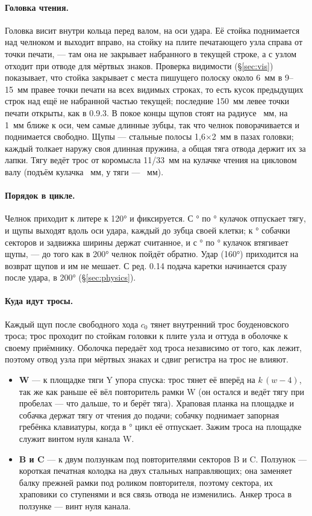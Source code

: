 \paragraph{Головка чтения.} Головка висит внутри кольца перед валом, на оси удара. Её стойка поднимается над челноком и выходит вправо, на стойку на плите печатающего узла справа от точки печати, — там она не закрывает набранного в текущей строке, а с узлом отходит при отводе для мёртвых знаков. Проверка видимости (\S\ref{sec:vis}) показывает, что стойка закрывает с места пишущего полоску около 6~мм в 9--15~мм правее точки печати на всех видимых строках, то есть кусок предыдущих строк над ещё не набранной частью текущей; последние 150~мм левее точки печати открыты, как в 0.9.3. В покое концы щупов стоят на радиусе \rdRzero~мм, на 1~мм ближе к оси, чем самые длинные зубцы, так что челнок поворачивается и поднимается свободно. Щупы — стальные полосы 1,6$\times$2~мм в пазах головки; каждый толкает наружу своя длинная пружина, а общая тяга отвода держит их за лапки. Тягу ведёт трос от коромысла 11/33~мм на кулачке чтения на цикловом валу (подъём кулачка \rdcam~мм, у тяги — \rdtravel~мм).

\paragraph{Порядок в цикле.} Челнок приходит к литере к 120° и фиксируется. С \rdrelease° по \rdout° кулачок отпускает тягу, и щупы выходят вдоль оси удара, каждый до зубца своей клетки; к \rdin° собачки секторов и задвижка ширины держат считанное, и с \rdin° по \rdback° кулачок втягивает щупы, — до того как в 200° челнок пойдёт обратно. Удар (160°) приходится на возврат щупов и им не мешает. С ред. 0.14 подача каретки начинается сразу после удара, в 200° (\S\ref{sec:physics}).

\paragraph{Куда идут тросы.} Каждый щуп после свободного хода $c_0$ тянет внутренний трос боуденовского троса; трос проходит по стойкам головки к плите узла и оттуда в оболочке к своему приёмнику. Оболочка передаёт ход троса независимо от того, как лежит, поэтому отвод узла при мёртвых знаках и сдвиг регистра на трос не влияют.
\begin{itemize}
  \item \textbf{W} — к площадке тяги Y упора спуска: трос тянет её вперёд на $k\,(w - 4)$, так же как раньше её вёл повторитель рамки W (он остался и ведёт тягу при пробелах — что дальше, то и берёт тяга). Храповая планка на площадке и собачка держат тягу от чтения до подачи; собачку поднимает запорная гребёнка клавиатуры, когда в \rdlatch° цикл её отпускает. Зажим троса на площадке служит винтом нуля канала W.
  \item \textbf{B и C} — к двум ползункам под повторителями секторов B и C. Ползунок — короткая печатная колодка на двух стальных направляющих; она заменяет балку прежней рамки под роликом повторителя, поэтому сектора, их храповики со ступенями и вся связь отвода не изменились. Анкер троса в ползунке — винт нуля канала.
\end{itemize}


